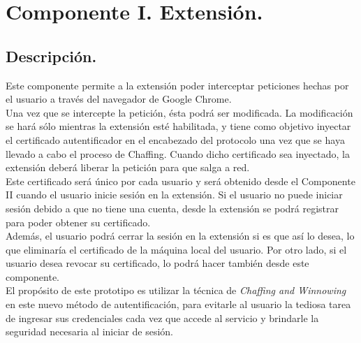 \documentclass[12pt, a4paper, titlepage]{report}
\begin{document}
		\section{Componente I. Extensión.}
		    \subsection{Descripción.}
		    
		    Este componente permite a la extensión poder interceptar peticiones hechas por el usuario a través del navegador de Google Chrome.\\
		    Una vez que se intercepte la petición, ésta podrá ser modificada. La modificación se hará sólo mientras la extensión esté habilitada, y tiene como objetivo inyectar el certificado autentificador en el encabezado del protocolo una vez que se haya llevado a cabo el proceso de Chaffing. Cuando dicho certificado sea inyectado, la extensión deberá liberar la petición para que salga a red.\\
		    Este certificado será único por cada usuario y será obtenido desde el Componente II cuando el usuario inicie sesión en la extensión. Si el usuario no puede iniciar sesión debido a que no tiene una cuenta, desde la extensión se podrá registrar para poder obtener su certificado.\\
		    Además, el usuario podrá cerrar la sesión en la extensión si es que así lo desea, lo que eliminaría el certificado de la máquina local del usuario. Por otro lado, si el usuario desea revocar su certificado, lo podrá hacer también desde este componente.\\
		    
		    El propósito de este prototipo es utilizar la técnica de \textit{Chaffing and Winnowing} en este nuevo método de autentificación, para evitarle al usuario la tediosa tarea de ingresar sus credenciales cada vez que accede al servicio y brindarle la seguridad necesaria al iniciar de sesión.\\
		    
\end{document}
